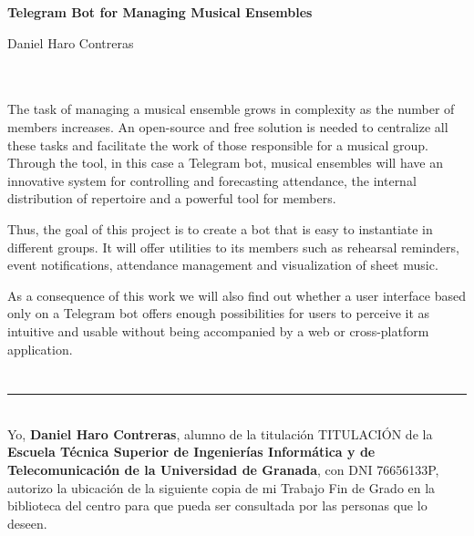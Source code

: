 \cleardoublepage


\thispagestyle{empty}


\begin{center}
{\large\bfseries Telegram Bot for Managing Musical Ensembles}\\
\end{center}
\begin{center}
Daniel Haro Contreras\\
\end{center}

\\

\vspace{0.7cm}
\\

The task of managing a musical ensemble grows in complexity as the number of members increases. An open-source and free solution is needed to centralize all these tasks and facilitate the work of those responsible for a musical group. Through the tool, in this case a Telegram bot, musical ensembles will have an innovative system for controlling and forecasting attendance, the internal distribution of repertoire and a powerful tool for members.

Thus, the goal of this project is to create a bot that is easy to instantiate in different groups. It will offer utilities to its members such as rehearsal reminders, event notifications, attendance management and visualization of sheet music.

As a consequence of this work we will also find out whether a user interface based only on a Telegram bot offers enough possibilities for users to perceive it as intuitive and usable without being accompanied by a web or cross-platform application.

\chapter*{}
\thispagestyle{empty}

\noindent\rule[-1ex]{\textwidth}{2pt}\\[4.5ex]

Yo, \textbf{Daniel Haro Contreras}, alumno de la titulación TITULACIÓN de la \textbf{Escuela Técnica Superior
de Ingenierías Informática y de Telecomunicación de la Universidad de Granada}, con DNI 76656133P, autorizo la
ubicación de la siguiente copia de mi Trabajo Fin de Grado en la biblioteca del centro para que pueda ser
consultada por las personas que lo deseen.

